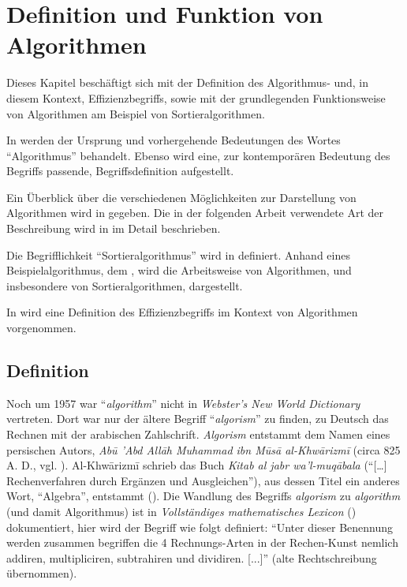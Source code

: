 \chapter{Definition und Funktion von Algorithmen}
\label{cha:definition-funktion-algorithmen}
\vspace{-0.25cm}
Dieses Kapitel beschäftigt sich mit der Definition des Algorithmus- und, in diesem Kontext, Effizienzbegriffs, sowie mit der grundlegenden Funktionsweise von Algorithmen am Beispiel von Sortieralgorithmen.

In  werden der Ursprung und vorhergehende Bedeutungen des Wortes \enquote{Algorithmus} behandelt. Ebenso wird eine, zur kontemporären Bedeutung des Begriffs passende, Begriffsdefinition aufgestellt.

Ein Überblick über die verschiedenen Möglichkeiten zur Darstellung von Algorithmen wird in  gegeben. Die in der folgenden Arbeit verwendete Art der Beschreibung wird in  im Detail beschrieben.

Die Begrifflichkeit \enquote{Sortieralgorithmus} wird in  definiert. Anhand eines Beispielalgorithmus, dem , wird die Arbeitsweise von Algorithmen, und insbesondere von Sortieralgorithmen, dargestellt.

In  wird eine Definition des Effizienzbegriffs im Kontext von Algorithmen vorgenommen.
%
\vspace{-0.25cm}
\section{Definition}
\label{sec:algorithm-definition}

Noch um 1957 war \enquote{\emph{algorithm}} nicht in \emph{Webster's New World Dictionary} vertreten. Dort war nur der ältere Begriff \enquote{\emph{algorism}} zu finden, zu Deutsch das Rechnen mit der arabischen Zahlschrift. \emph{Algorism} entstammt dem Namen eines persischen Autors, \emph{Abū 'Abd Allāh Muhammad ibn Mūsā al-Khwārizmī} \footnotemark (circa 825 A. D., vgl. \cite[1--2]{taocp1}). Al-Khwārizmī schrieb das Buch \emph{Kitab al jabr wa'l-muqābala} (\enquote{[\ldots] Rechenverfahren durch Ergänzen und Ausgleichen}), aus dessen Titel ein anderes Wort, \enquote{Algebra}, entstammt (\cite[197--199]{ger1984}). Die Wandlung des Begriffs \emph{algorism} zu \emph{algorithm} (und damit Algorithmus) ist in \emph{Vollständiges mathematisches Lexicon} (\cite[38]{wol1747}) dokumentiert, hier wird der Begriff wie folgt definiert: \enquote{Unter dieser Benennung werden zusammen begriffen die 4 Rechnungs-Arten in der Rechen-Kunst nemlich addiren, multipliciren, subtrahiren und dividiren. [...]} (alte Rechtschreibung übernommen).

